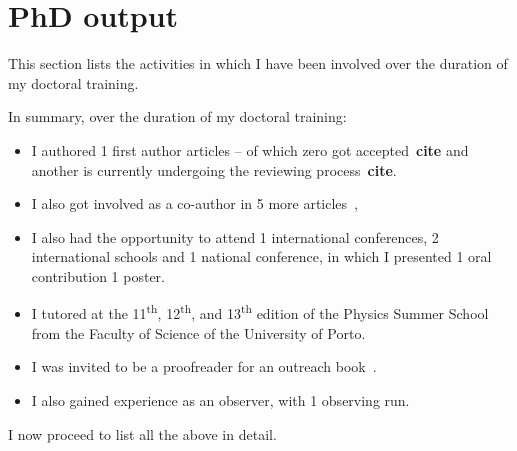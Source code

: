 \chapter{PhD output}\label{app:phd_output}

This section lists the activities in which I have been involved over the duration of my doctoral training.

In summary, over the duration of my doctoral training:
\begin{itemize}
    \item I authored {\red{} 1} first author articles -- of which {\red{} zero} got accepted~\textbf{cite} and another is currently undergoing the reviewing process~\textbf{cite}. 
    \item I also got involved as a co-author in 5 more articles~\citep{figueira_radial_2016, barros_precise_2017, santerne_earthsized_2018, lillo-box_troy_2018, ulmer-moll_telluric_2018},
    \item I also had the opportunity to attend 1 international conferences, 2 international schools and 1 national conference, in which I presented 1 oral contribution 1 poster.
    \item I tutored at the 11\textsuperscript{th}, 12\textsuperscript{th}, and 13\textsuperscript{th} edition of the Physics Summer School from the Faculty of Science of the University of Porto.
    \item I was invited to be a proofreader for an outreach book~\citet{figueira_astro_2015}.
    \item I also gained experience as an observer, with 1 observing run.
\end{itemize}

I now proceed to list all the above in detail.

\clearpage


\clearpage


\clearpage


\clearpage


\clearpage


\clearpage

